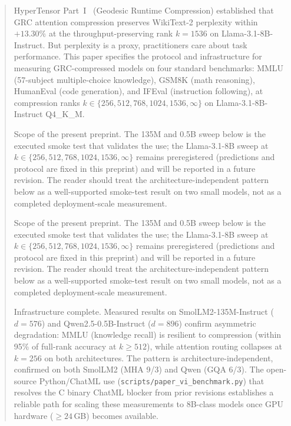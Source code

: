\documentclass[11pt]{article}
\begin{document}
\hypertensorbanner

\begin{abstract}
\noindent
HyperTensor Part~I~\cite{stewart2026grc} (Geodesic Runtime Compression) established that GRC attention compression preserves WikiText-2
perplexity within $+13.30\%$ at the throughput-preserving rank $k{=}1536$
on Llama-3.1-8B-Instruct.  But perplexity is a proxy, practitioners care
about task performance.  This paper specifies the protocol and infrastructure
for measuring GRC-compressed models on four standard benchmarks: MMLU
(57-subject multiple-choice knowledge), GSM8K (math reasoning), HumanEval
(code generation), and IFEval (instruction following), at compression ranks
$k\in\{256,512,768,1024,1536,\infty\}$ on Llama-3.1-8B-Instruct Q4\_K\_M.

Scope of the present preprint. The 135M and 0.5B sweep
below is the executed smoke test that validates the use; the
Llama-3.1-8B sweep at $k\in\{256,512,768,1024,1536,\infty\}$
remains preregistered (predictions and protocol are fixed in this
preprint) and will be reported in a future revision. The reader
should treat the architecture-independent pattern below as a
well-supported smoke-test result on two small models, not as a
completed deployment-scale measurement.

Scope of the present preprint. The 135M and 0.5B sweep
below is the executed smoke test that validates the use; the
Llama-3.1-8B sweep at $k\in\{256,512,768,1024,1536,\infty\}$
remains preregistered (predictions and protocol are fixed in this
preprint) and will be reported in a future revision. The reader
should treat the architecture-independent pattern below as a
well-supported smoke-test result on two small models, not as a
completed deployment-scale measurement.

Infrastructure complete.  Measured results on SmolLM2-135M-Instruct
($d{=}576$) and Qwen2.5-0.5B-Instruct ($d{=}896$) confirm asymmetric
degradation: MMLU (knowledge recall) is resilient to compression (within
95\% of full-rank accuracy at $k{\ge}512$), while attention routing
collapses at $k{=}256$ on both architectures.  The pattern is
architecture-independent, confirmed on both SmolLM2 (MHA 9/3) and Qwen
(GQA 6/3).  The open-source Python/ChatML use
(\texttt{scripts/paper\_vi\_benchmark.py}) that resolves the C binary
ChatML blocker from prior revisions establishes a reliable path for
scaling these measurements to 8B-class models once GPU hardware
(${\ge}24$\,GB) becomes available.
\end{abstract}
\end{document}
